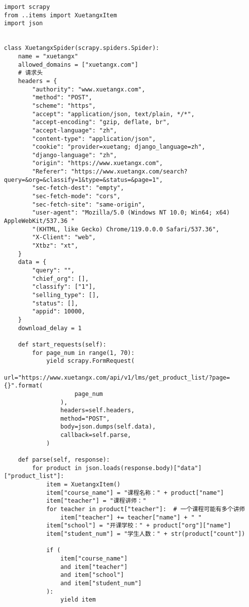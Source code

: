 \documentclass[lang=cn,11pt,a4paper]{elegantpaper}
\begin{document}
\begin{lstlisting}
import scrapy
from ..items import XuetangxItem
import json


class XuetangxSpider(scrapy.spiders.Spider):
    name = "xuetangx"
    allowed_domains = ["xuetangx.com"]
    # 请求头
    headers = {
        "authority": "www.xuetangx.com",
        "method": "POST",
        "scheme": "https",
        "accept": "application/json, text/plain, */*",
        "accept-encoding": "gzip, deflate, br",
        "accept-language": "zh",
        "content-type": "application/json",
        "cookie": "provider=xuetang; django_language=zh",
        "django-language": "zh",
        "origin": "https://www.xuetangx.com",
        "Referer": "https://www.xuetangx.com/search?query=&org=&classify=1&type=&status=&page=1",
        "sec-fetch-dest": "empty",
        "sec-fetch-mode": "cors",
        "sec-fetch-site": "same-origin",
        "user-agent": "Mozilla/5.0 (Windows NT 10.0; Win64; x64) AppleWebKit/537.36 "
        "(KHTML, like Gecko) Chrome/119.0.0.0 Safari/537.36",
        "X-Client": "web",
        "Xtbz": "xt",
    }
    data = {
        "query": "",
        "chief_org": [],
        "classify": ["1"],
        "selling_type": [],
        "status": [],
        "appid": 10000,
    }
    download_delay = 1

    def start_requests(self):
        for page_num in range(1, 70):
            yield scrapy.FormRequest(
                url="https://www.xuetangx.com/api/v1/lms/get_product_list/?page={}".format(
                    page_num
                ),
                headers=self.headers,
                method="POST",
                body=json.dumps(self.data),
                callback=self.parse,
            )

    def parse(self, response):
        for product in json.loads(response.body)["data"]["product_list"]:
            item = XuetangxItem()
            item["course_name"] = "课程名称：" + product["name"]
            item["teacher"] = "课程讲师："
            for teacher in product["teacher"]:  # 一个课程可能有多个讲师
                item["teacher"] += teacher["name"] + " "
            item["school"] = "开课学校：" + product["org"]["name"]
            item["student_num"] = "学生人数：" + str(product["count"])

            if (
                item["course_name"]
                and item["teacher"]
                and item["school"]
                and item["student_num"]
            ):
                yield item

\end{lstlisting}
\end{document}
